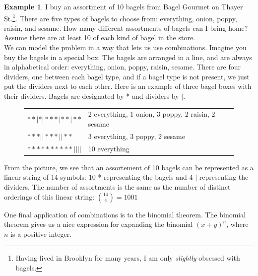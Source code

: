 \documentclass[12pt]{article}
\theoremstyle{definition}
\newtheorem*{example}{Example}
\theoremstyle{remark}
\begin{document}
\begin{example}
I buy an assortment of 10 bagels from Bagel Gourmet on Thayer St.\footnote{Having lived in Brooklyn for many years, I am only \emph{slightly} obsessed with bagels.}. There are five types of bagels to choose from: everything, onion, poppy, raisin, and sesame. How many different assortments of bagels can I bring home? Assume there are at least 10 of each kind of bagel in the store.\\

We can model the problem in a way that lets us use combinations. Imagine you buy the bagels in a special box. The bagels are arranged in a line, and are always in alphabetical order: everything, onion, poppy, raisin, sesame. There are four dividers, one between each bagel type, and if a bagel type is not present, we just put the dividers next to each other. Here is an example of three bagel boxes with their dividers. Bagels are designated by * and dividers by $|$.
\begin{figure}[H]
\begin{tabular}{ll}
$* * | * | * * * | * * | * *$ & 2 everything, 1 onion, 3 poppy, 2 raisin, 2 sesame \\
$* * * | | * * * | | * *$ & 3 everything, 3 poppy, 2 sesame\\
$* * * * * * * * * * | | | |$ & 10 everything\\
\end{tabular}
\end{figure}
From the picture, we see that an assortement of 10 bagels can be represented as a linear string of 14 symbols: 10 * representing the bagels and 4 $|$ representing the dividers. The number of assortments is the same as the number of distinct orderings of this linear string: $\binom{14}{4} = 1001$
\end{example}


One final application of combinations is to the binomial theorem. The binomial theorem gives us a nice expression for expanding the binomial $(x+y)^n$, where $n$ is a positive integer.
\end{document}
